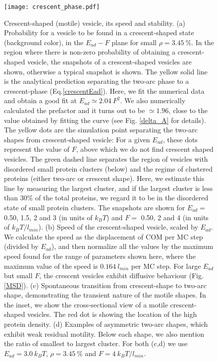 \documentclass[pre,amsmath]{revtex4}
\begin{document}
\begin{figure}[ht!]
\centering
\texttt{[image: crescent\_phase.pdf]}
\caption{Crescent-shaped (motile) vesicle, its speed and stability. (a) Probability for a vesicle to be found in a crescent-shaped state (background color), in the $E_{ad}-F$ plane for small $\rho=3.45~\%$. In the region where there is non-zero probability of obtaining a crescent-shaped vesicle, the  snapshots of a crescent-shaped vesicles are shown, otherwise a typical snapshot is shown. The yellow solid line is the analytical prediction separating the two-arc phase to a crescent-phase (Eq.\ref{crescentEad}). Here, we fit the numerical data and obtain a good fit at $ E_{ad} \simeq 2.04 ~F^2$. We also numerically calculated the prefactor and it turns out to be $\simeq 1.96$, close to the value obtained by fitting the curve (see Fig. \ref{delta_A} for details). The yellow dots are the simulation point separating the two-arc shapes from crescent-shaped vesicle: For a given $E_{ad}$, these dots represent the value of $F$, above which we do not find crescent shaped vesicles. The green dashed line separates the region of vesicles with disordered small protein clusters (below) and the regime of clustered proteins (either two-arc or crescent shape). Here, we estimate this line by measuring the largest cluster, and if the largest cluster is less than $30 \%$ of the total proteins, we regard it to be in the disordered state of small protein clusters. The snapshots are shown for $E_{ad}=$ 0.50, 1.5, 2 and 3 (in units of $k_B T$) and $F=$ 0.50, 2 and 4 (in units of $k_B T/l_{min}$). (b) Speed of the crescent-shaped vesicle, scaled by $E_{ad}$. We calculate the speed as the displacement of COM per MC step (divided by $E_{ad}$), and then normalize all the values by the maximum speed found for the range of parameters shown here, where the maximum value of the speed is $0.164 ~ l_{min}$ per MC step. For large $E_{ad}$ but small $F$, the crescent vesicles exhibit diffusive behaviour (Fig.\ref{MSD}). (c)  Spontaneous transition from crescent-shape to two-arc shape, demonstrating the transient nature of the motile shapes. In the inset, we show the cross-sectional view of a motile crescent-shaped vesicles. The red dot is showing the location of the high protein density. (d) Examples of asymmetric two-arc shapes, which exhibit weak residual motility. Below each shape, we also mention the ratio of smallest to largest cluster. For both (c,d) we use $E_{ad}=3.0 ~k_B T$, $\rho=3.45 ~\%$ and $F=4 ~k_B T/l_{min}$.}
\label{phase_crescent} 
\end{figure}
\end{document}
